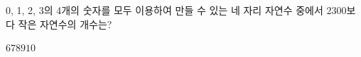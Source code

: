 0, 1, 2, 3의 4개의 숫자를 모두 이용하여 만들 수 있는 네 자리 자연수 중에서 2300보다 작은 자연수의 개수는?
\begin{choices32}{$6$}{$7$}{$8$}{$9$}{$10$}\end{choices32}
